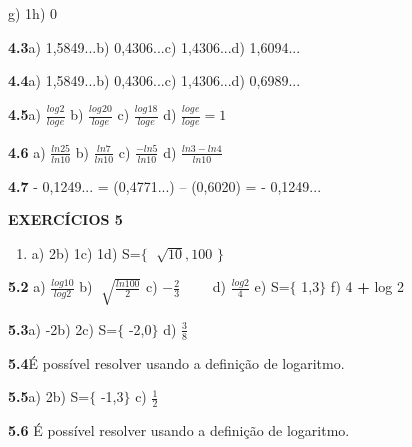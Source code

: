 \documentclass[12pt]{article}
\begin{document}
\begin{enumerate}
\tab g) 1\tab \tab h) 0\par

\textbf{4.3}\tab a) 1,5849...\tab b) 0,4306...\tab c) 1,4306...\tab d) 1,6094...\par

\textbf{4.4\tab }a) 1,5849...\tab b) 0,4306...\tab c) 1,4306...\tab d) 0,6989...\par

\textbf{4.5\tab }a)  \( \frac{log_{}2}{log_{}e} \) \tab b)  \( \frac{log_{}20}{log_{}e} \) \tab c)  \( \frac{log_{}18}{log_{}e} \) \tab d)  \( \frac{log_{}e}{log_{}e}=1 \) {\fontsize{14pt}{16.8pt}\selectfont  \par}\par

\textbf{4.6 \tab }a)  \( \frac{ln25}{ln10} \) \tab \tab b)  \( \frac{ln7}{ln10} \) \tab \tab c)  \( \frac{-ln5}{ln10} \) \tab \tab d)  \( \frac{ln3-ln4}{ln10} \) \par

\textbf{4.7 }\tab - 0,1249... = (0,4771...) – (0,6020) = - 0,1249...\par


\vspace{\baselineskip}
\setlength{\parskip}{6.0pt}
\textbf{EXERCÍCIOS 5}\par

\begin{enumerate}[label*={\fontsize{12pt}{12pt}\selectfont \textbf{\arabic*.}}]
	\item a) 2\tab \tab b) 1\tab \tab c) 1\tab \tab d) S=$ \{ $  \( \sqrt[]{10},100 \) $ \} $ 
\end{enumerate}\par

\textbf{5.2} a)  \( \frac{log10}{log2} \) \tab b)  \( \sqrt[]{\frac{ln100}{2}} \) \tab c)  \( -\frac{2}{3} \) \tab \ \ \ \  d)  \( \frac{log2}{4} \) \tab e) S=$ \{ $ 1,3$ \} $ \tab f) 4 \textbf{+} log 2\par

\textbf{5.3\tab }a) -2\tab \tab b) 2\tab \tab c) S=$ \{ $ -2,0$ \} $ \tab d)  \( \frac{3}{8} \) \par

\textbf{5.4}\tab É possível resolver usando a definição de logaritmo.\par

\textbf{5.5\tab }a) 2\tab \tab b) S=$ \{ $ -1,3$ \} $ \tab c)  \( \frac{1}{2} \) \tab \par

\textbf{5.6 \tab }É possível resolver usando a definição de logaritmo.\par


\end{enumerate}
\end{document}
